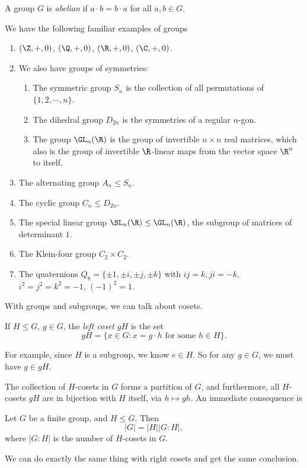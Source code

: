 \documentclass[a4paper]{article}
\begin{document}
\begin{defi}
  A group $G$ is \emph{abelian} if $a\cdot b = b\cdot a$ for all $a, b\in G$.
\end{defi}

\begin{eg}
  We have the following familiar examples of groups
  \begin{enumerate}
    \item $(\Z, +, 0)$, $(\Q, +, 0)$, $(\R, +, 0)$, $(\C, +, 0)$.
    \item We also have groups of symmetries:
      \begin{enumerate}
        \item The symmetric group $S_n$ is the collection of all permutations of $\{1, 2, \cdots, n\}$.
        \item The dihedral group $D_{2n}$ is the symmetries of a regular $n$-gon.
        \item The group $\GL_n(\R)$ is the group of invertible $n\times n$ real matrices, which also is the group of invertible $\R$-linear maps from the vector space $\R^n$ to itself.
      \end{enumerate}
    \item The alternating group $A_n \leq S_n$.
    \item The cyclic group $C_n \leq D_{2n}$.
    \item The special linear group $\SL_n(\R) \leq \GL_n(\R)$, the subgroup of matrices of determinant $1$.
    \item The Klein-four group $C_2 \times C_2$.
    \item The quaternions $Q_8 = \{\pm 1, \pm i, \pm j, \pm k\}$ with $ij = k, ji = -k$, $i^2 = j^2 = k^2 = -1$, $(-1)^2 = 1$.
  \end{enumerate}
\end{eg}

With groups and subgroups, we can talk about cosets.
\begin{defi}[Coset]
  If $H \leq G$, $g \in G$, the \emph{left coset} $gH$ is the set
  \[
    gH = \{x \in G: x = g\cdot h\text{ for some }h \in H\}.
  \]
\end{defi}
For example, since $H$ is a subgroup, we know $e \in H$. So for any $g \in G$, we must have $g \in gH$.

The collection of $H$-cosets in $G$ forms a partition of $G$, and furthermore, all $H$-cosets $gH$ are in bijection with $H$ itself, via $h \mapsto gh$. An immediate consequence is
\begin{thm}
  Let $G$ be a finite group, and $H \leq G$. Then
  \[
    |G| = |H| |G:H|,
  \]
  where $|G:H|$ is the number of $H$-cosets in $G$.
\end{thm}
We can do exactly the same thing with right cosets and get the same conclusion.
\end{document}
